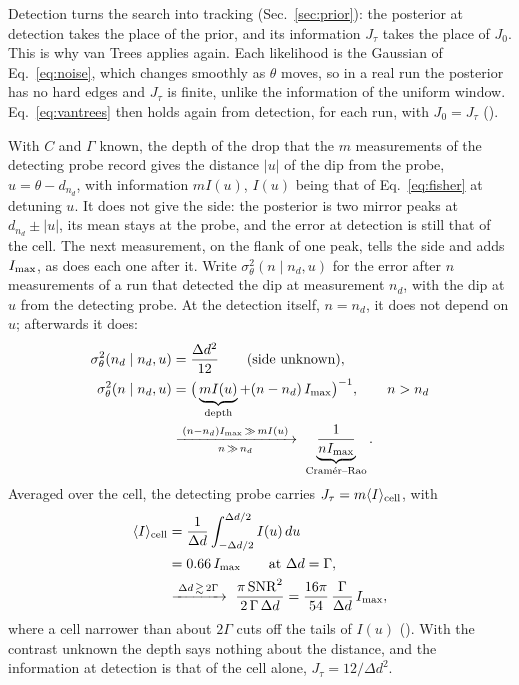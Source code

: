 Detection turns the search into tracking (Sec.~\ref{sec:prior}): the posterior at detection takes the place of the
prior, and its information $J_\tau$ takes the place of $J_0$. This is why van Trees applies again. Each likelihood is
the Gaussian of Eq.~\eqref{eq:noise}, which changes smoothly as $\theta$ moves, so in a real run the posterior has no
hard edges and $J_\tau$ is finite, unlike the information of the uniform window. Eq.~\eqref{eq:vantrees} then holds
again from detection, for each run, with $J_0=J_\tau$ ().

With $C$ and $\Gamma$ known, the depth of the drop that the $m$ measurements of the detecting probe record gives the
distance $|u|$ of the dip from the probe, $u=\theta-d_{n_d}$, with information $mI(u)$, $I(u)$ being that of
Eq.~\eqref{eq:fisher} at detuning $u$. It does not give the side: the posterior is two mirror peaks at
$d_{n_d}\pm|u|$, its mean stays at the probe, and the error at detection is still that of the cell. The next
measurement, on the flank of one peak, tells the side and adds $I_{\rm max}$, as does each one after it. Write
$\sigma_\theta^2(n\mid n_d,u)$ for the error after $n$ measurements of a run that detected the dip at measurement
$n_d$, with the dip at $u$ from the detecting probe. At the detection itself, $n=n_d$, it does not depend on $u$;
afterwards it does:
\begin{equation}
  \begin{aligned}
  \sigma_\theta^2(n_d\mid n_d,u)&=\frac{\Delta d^2}{12}\qquad\text{(side unknown)},\\
  \sigma_\theta^2(n\mid n_d,u)&=\big(\underbrace{mI(u)}_{\text{depth}}+(n-n_d)\,I_{\rm max}\big)^{-1},\qquad n>n_d\\
  &\xrightarrow[\;n\,\gg\,n_d\;]{\;(n-n_d)I_{\rm max}\,\gg\,mI(u)\;}\
  \underbrace{\frac{1}{nI_{\rm max}}}_{\text{Cram\'er--Rao}} .
  \end{aligned}
  \label{eq:after-detection}
\end{equation}
Averaged over the cell, the detecting probe carries $J_\tau=m\langle I\rangle_{\rm cell}$, with
\begin{equation}
  \begin{aligned}
  \langle I\rangle_{\rm cell}&=\frac{1}{\Delta d}\int_{-\Delta d/2}^{\Delta d/2}I(u)\,du\\
  &=0.66\,I_{\rm max}\qquad\text{at }\Delta d=\Gamma,\\
  &\xrightarrow{\;\Delta d\,\gtrsim\,2\Gamma\;}\ \frac{\pi\,\mathrm{SNR}^2}{2\,\Gamma\,\Delta d}
  =\frac{16\pi}{54}\,\frac{\Gamma}{\Delta d}\,I_{\rm max},
  \end{aligned}
  \label{eq:cell-info}
\end{equation}
where a cell narrower than about $2\Gamma$ cuts off the tails of $I(u)$ (). With the contrast unknown
the depth says nothing about the distance, and the information at detection is that of the cell alone,
$J_\tau=12/\Delta d^2$.

